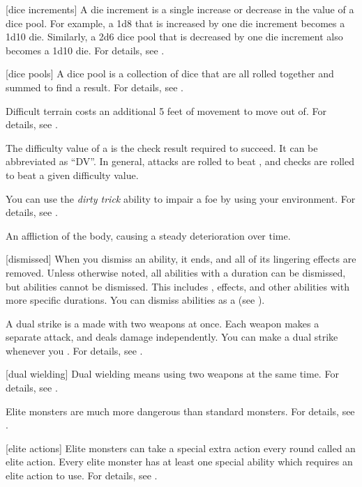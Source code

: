 [dice increments] A die increment is a single increase or decrease in the value of a dice pool.
For example, a 1d8 that is increased by one die increment becomes a 1d10 die.
Similarly, a 2d6 dice pool that is decreased by one die increment also becomes a 1d10 die.
For details, see .

[dice pools] A dice pool is a collection of dice that are all rolled together and summed to find a result.
For details, see .

 Difficult terrain costs an additional 5 feet of movement to move out of.
For details, see .

 The difficulty value of a  is the check result required to succeed.
It can be abbreviated as ``DV''.
In general, attacks are rolled to beat , and checks are rolled to beat a given difficulty value.

 You can use the \textit{dirty trick} ability to impair a foe by using your environment.
For details, see .

 An affliction of the body, causing a steady deterioration over time.

[dismissed] When you dismiss an ability, it ends, and all of its lingering effects are removed.
Unless otherwise noted, all \magical abilities with a duration can be dismissed, but  abilities cannot be dismissed.
This includes ,  effects, and other abilities with more specific durations.
You can dismiss abilities as a  (see ).

 A dual strike is a  made with two weapons at once.
Each weapon makes a separate attack, and deals damage independently.
You can make a dual strike whenever you .
For details, see .

[dual wielding] Dual wielding means using two weapons at the same time.
For details, see .

 Elite monsters are much more dangerous than standard monsters.
For details, see .

[elite actions] Elite monsters can take a special extra action every round called an elite action.
Every elite monster has at least one special ability which requires an elite action to use.
For details, see .

